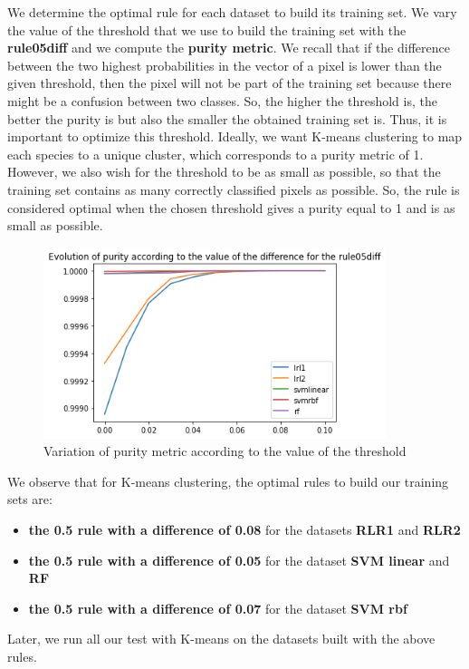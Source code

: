 \documentclass{siamart171218}
\begin{document}
We determine the optimal rule for each dataset to build its training set. 
We vary the value of the threshold that we use to build the training set with the \textbf{rule05diff} and we compute the \textbf{purity metric}. 
We recall that if the difference between the two highest probabilities in the vector of a pixel is lower than the given threshold, then the pixel will not be part of the training set because there might be a confusion between two classes. So, the higher the threshold is, the better the purity is but also the smaller the obtained training set is. Thus, it is important to optimize this threshold. Ideally, we want K-means clustering to map each species to a unique cluster, which corresponds to a purity metric of 1. However, we also wish for the threshold to be as small as possible, so that the training set contains as many correctly classified pixels as possible. So, the rule is considered optimal when the chosen threshold gives a purity equal to 1 and is as small as possible. 

\begin{figure}[H]
    \centering
    \includegraphics[width=10cm]{images/purity_kmeans.png}
    \caption{Variation of purity metric according to the value of the threshold}
    \label{purity}
\end{figure}

We observe that for K-means clustering, the optimal rules to build our training sets are: 
\begin{itemize}
\item{\textbf{the 0.5 rule with a difference of 0.08} for the datasets \textbf{RLR1} and \textbf{RLR2}}
\item{\textbf{the 0.5 rule with a difference of 0.05} for the dataset \textbf{SVM linear} and \textbf{RF}}
\item{\textbf{the 0.5 rule with a difference of 0.07} for the dataset \textbf{SVM rbf}}
\end{itemize} 
Later, we run all our test with K-means on the datasets built with the above rules.
\end{document}
